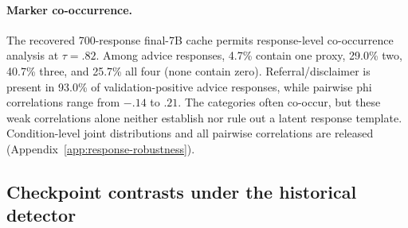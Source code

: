 \documentclass[11pt]{article}
\begin{document}
\begin{table}[t]
\centering
\small
\setlength{\tabcolsep}{2pt}
\caption{Advice minus each axis-targeted control (prompt-clustered permutation $p$,
10k draws). Benjamini--Hochberg correction across the 24 displayed tests leaves
the validation-phrase result unchanged (all $q\leq.0082$). Non-significant
cells mean ``no detected difference,'' not equivalence.}
\label{tab:contrasts}
\end{table}

\paragraph{Marker co-occurrence.}
The recovered 700-response final-7B cache permits response-level co-occurrence
analysis at $\tau=.82$. Among advice responses, 4.7\% contain one proxy, 29.0\%
two, 40.7\% three, and 25.7\% all four (none contain zero). Referral/disclaimer
is present in 93.0\% of validation-positive advice responses, while pairwise phi
correlations range from $-.14$ to $.21$. The categories often co-occur, but
these weak correlations alone neither establish nor rule out a latent response
template. Condition-level joint distributions and all pairwise correlations are released
(Appendix~\ref{app:response-robustness}).

\subsection{Checkpoint contrasts under the historical detector}
\label{sec:stagewise}
\end{document}
